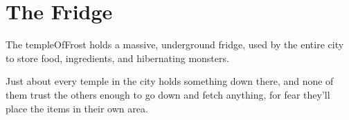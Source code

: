 \section{The Fridge}
\label{theFridge}

\begin{multicols}{2}

\noindent
The \gls{templeOfFrost} holds a massive, underground fridge, used by the entire city to store food, \glspl{ingredient}, and hibernating \glspl{monster}.

Just about every \gls{temple} in the city holds something down there, and none of them trust the others enough to go down and fetch anything, for fear they'll place the items in their own area.

\renewcommand\csComments{
  \mapFeature{15,2}{\Huge \glssymbol{abderian}}
  \mapFeature{16,9}{\Huge \glssymbol{wrecan}}
  \mapFeature{3,6}{\Huge \glssymbol{sylf}}
  \mapFeature{2,1}{\Huge \glssymbol{sable}}
  \mapFeature{13,6}{\Huge \glssymbol{sable}}
  \mapFeature{12,3.6}{\Huge \glssymbol{paik}}
  \mapFeature{8,12}{\Huge \glssymbol{yonder}}
  \colorlet{background}{white!10!black!90}%
  \callout{17,5.7}{0,0}{\ref{fStairs}:~\nameref{fStairs}}{}
  \callout[7]{17.5,4}{-0.5,0}{\ref{fHallStore}:~\nameref{fHallStore}}{}
  \callout[8]{13,4.8}{0,0}{\ref{fLift}:~\nameref{fLift}}{}
  \callout[9]{17,1}{-0.5,0.5}{\ref{fWheat}:~\nameref{fWheat}}{}
  \callout[9]{13.2,1}{0.5,0.3}{\ref{fIngStore}:~\nameref{fIngStore}}{}
  \callout[10]{17,10.5}{-0.5,-0.5}{\ref{fOffice}:~\nameref{fOffice}}{Everything entered must be registered}
  \callout[12]{15,12}{-0.7,-3}{\ref{fDip}:~\nameref{fDip}}{with oil barrels}
  \callout{11,10.3}{0.8,0}{\ref{fSide}:~\nameref{fSide}}{}
  \colorlet{background}{white!10!black!80}%
  \callout[9]{7,5.5}{0,0}{\ref{fBoat}:~\nameref{fBoat}}{}
  \callout[7]{0,8}{0.3,0}{\ref{fCrossbow}:~\nameref{fCrossbow}}{}
  \callout[10]{1,11}{0,-1}{\ref{fHibernation}:~\nameref{fHibernation}}{}
  \callout[10]{4.2,4.3}{-2.7,1}{\ref{fWeaponStore}:~\nameref{fWeaponStore}}{}
  \colorlet{background}{white!10!black!70}%
  \callout[10]{4.5,2.7}{-1,-0.3}{\ref{fCheeseStorage}:~\nameref{fCheeseStorage}}{}
  \callout[8]{3.4,1}{-0,0.4}{\ref{fFabrics}:~\nameref{fFabrics}}{}
  \callout[10]{2,0}{-0.4,0.5}{\ref{fGrain}:~\nameref{fGrain}}{}
  \callout[8]{0,3.5}{0.2,-0.2}{\ref{fSpirits}:~\nameref{fSpirits}}{}
  \colorlet{background}{white!10!black!60}%
  \callout[10]{2,14}{4,-1}{\ref{fLibrarians}:~\nameref{fLibrarians}}{}
  \callout[8]{8,10.8}{1,0.8}{\ref{fGiftschrank}:~\nameref{fGiftschrank}}{}
  \callout[9]{10,14}{0.1,-0.6}{\ref{fBrack}:~\nameref{fBrack}}{}
  \callout[12]{15,13}{-3,-0.4}{\ref{fLibrary}:~\nameref{fLibrary}}{}
  \colorlet{background}{white!10!black!50}%
  \callout[7]{6,0}{1,1.2}{\ref{fDoor}:~\nameref{fDoor}}{}
  \callout[8]{10,0}{0,2}{\ref{fWaiting}:~\nameref{fWaiting}}{}
  \callout[9]{12,2.2}{0,0}{\ref{fCourt}:~\nameref{fCourt}}{}
}


\end{multicols}
